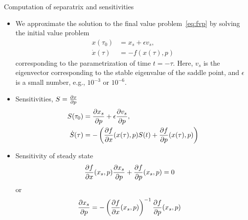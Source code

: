 \begin{frame}{Computation of separatrix and sensitivities}
	\begin{itemize}
		\item We approximate the solution to the final value problem~\eqref{eq:fvp} by solving the initial value problem
		\begin{subequations}
			\begin{align}
				x(\tau_0) &= x_s + \epsilon v_s, \\
				\dot x(\tau) &= -f(x(\tau), p)
			\end{align}
		\end{subequations}
		corresponding to the parametrization of time $t = -\tau$. Here, $v_s$ is the eigenvector corresponding to the stable eigenvalue of the saddle point, and $\epsilon$ is a small number, e.g., $10^{-3}$ or $10^{-6}$.
		\item Sensitivities, $S = \frac{\partial{x}}{\partial{p}}$
		\begin{subequations}
			\begin{align}
				S(\tau_0) &= \frac{\partial{x_s}}{\partial{p}} + \epsilon \frac{\partial{v_s}}{\partial{p}}, \\
				\dot S(\tau) &= -\left(\frac{\partial{f}}{\partial{x}}(x(\tau), p) S(t) + \frac{\partial{f}}{\partial{p}}(x(\tau), p)\right)
			\end{align}
		\end{subequations}
		\item Sensitivity of steady state
		\begin{align}
			\frac{\partial{f}}{\partial{x}}(x_s, p) \frac{\partial{x_s}}{\partial{p}} + \frac{\partial{f}}{\partial{p}}(x_s, p) &= 0
		\end{align}
		or
		\begin{align}
			\frac{\partial{x_s}}{\partial{p}} &= -\left(\frac{\partial{f}}{\partial{x}}(x_s, p)\right)^{-1} \frac{\partial{f}}{\partial{p}}(x_s, p)
		\end{align}
	\end{itemize}
\end{frame}

